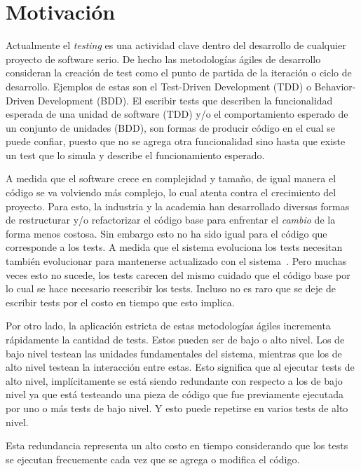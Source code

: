 \section{Motivación}
\par Actualmente el \emph{testing} es una actividad clave dentro del desarrollo de cualquier proyecto de software serio. De hecho las metodologías ágiles de desarrollo consideran la creación de test como el punto de partida de la iteración o ciclo de desarrollo. Ejemplos de estas son el Test-Driven Development (TDD) o Behavior-Driven Development (BDD). El escribir tests que describen la funcionalidad esperada de una unidad de software (TDD) y/o el comportamiento esperado de un conjunto de unidades (BDD), son formas de producir código en el cual se puede confiar, puesto que no se agrega otra funcionalidad sino hasta que existe un test que lo simula y describe el funcionamiento esperado.

\par A medida que el software crece en complejidad y tamaño, de igual manera el código se va volviendo más complejo, lo cual atenta contra el crecimiento del proyecto. Para esto, la industria y la academia han desarrollado diversas formas de restructurar y/o refactorizar el código base para enfrentar el \emph{cambio} de la forma menos costosa. Sin embargo esto no ha sido igual para el código que corresponde a los tests. A medida que el sistema evoluciona los tests necesitan también evolucionar para mantenerse actualizado con el sistema~\cite{reichhart2007rule}.  Pero muchas veces esto no sucede, los tests carecen del mismo cuidado que el código base por lo cual se hace necesario reescribir los tests. Incluso no es raro que se deje de escribir tests por el costo en tiempo que esto implica.

\par Por otro lado, la aplicación estricta de estas metodologías ágiles incrementa rápidamente la cantidad de tests. Estos pueden ser de bajo o alto nivel. Los de bajo nivel testean las unidades fundamentales del sistema,  mientras que los de alto nivel testean la interacción entre estas. Esto significa que al ejecutar tests de alto nivel, implícitamente se está siendo redundante con respecto a los de bajo nivel ya que está testeando una pieza de código que fue previamente ejecutada por uno o más tests de bajo nivel. Y esto puede repetirse en varios tests de alto nivel.

\par Esta redundancia representa un alto costo en tiempo considerando que los tests se ejecutan frecuemente cada vez que se agrega o modifica el código. 

